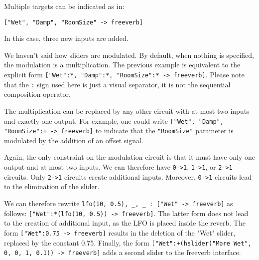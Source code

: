 Multiple targets can be indicated as in: 

\begin{lstlisting}
["Wet", "Damp", "RoomSize" -> freeverb]
\end{lstlisting}

In this case, three new inputs are added. 

We haven't said how sliders are modulated. By default, when nothing is specified, the modulation is a multiplication. The previous example is equivalent to the explicit form \lstinline`["Wet":*, "Damp":*, "RoomSize":* -> freeverb]`. Please note that the \lstinline`:` sign used here is just a visual separator, it is not the sequential composition operator. 

The multiplication can be replaced by any other circuit with at most two inputs and exactly one output. For example, one could write \lstinline`["Wet", "Damp", "RoomSize":+ -> freeverb]` to indicate that the \lstinline`"RoomSize"` parameter is modulated by the addition of an offset signal.

Again, the only constraint on the modulation circuit is that it must have only one output and at most two inputs. We can therefore have \lstinline`0->1`, \lstinline`1->1`, or \lstinline`2->1` circuits. Only \lstinline`2->1` circuits create additional inputs. Moreover, \lstinline`0->1` circuits lead to the elimination of the slider.

We can therefore rewrite \lstinline`lfo(10, 0.5), _, _ : ["Wet" -> freeverb]` as follows: \lstinline`["Wet":*(lfo(10, 0.5)) -> freeverb]`. The latter form does not lead to the creation of additional input, as the LFO is placed inside the reverb. The form \lstinline`["Wet":0.75 -> freeverb]` results in the deletion of the "Wet" slider, replaced by the constant 0.75. Finally, the form \lstinline`["Wet":+(hslider("More Wet", 0, 0, 1, 0.1)) -> freeverb]` adds a second slider to the freeverb interface.